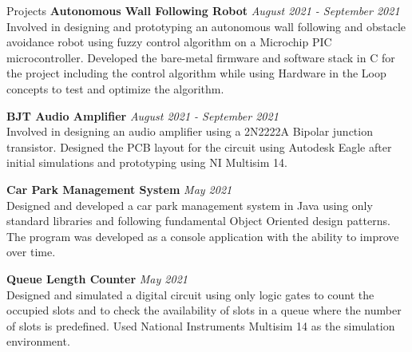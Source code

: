 \documentclass[
	11pt, %
]{./assets/resume} %
\begin{document}
\begin{rSection}{Projects}
{\bf Autonomous Wall Following Robot} \hfill {\em August 2021 - September 2021} \\
Involved in designing and prototyping an autonomous wall following and obstacle avoidance robot using fuzzy control algorithm on a Microchip PIC microcontroller. Developed the bare-metal firmware and software stack in C for the project including the control algorithm while using Hardware in the Loop concepts to test and optimize the algorithm.
    
{\bf BJT Audio Amplifier} \hfill {\em August 2021 - September 2021} \\
Involved in designing an audio amplifier using a 2N2222A Bipolar junction transistor. Designed the PCB layout for the circuit using Autodesk Eagle after initial simulations and prototyping using NI Multisim 14.
    
{\bf Car Park Management System} \hfill {\em May 2021} \\
Designed and developed a car park management system in Java using only standard libraries and following fundamental Object Oriented design patterns. The program was developed as a console application with the ability to improve over time.

{\bf Queue Length Counter} \hfill {\em May 2021} \\
Designed and simulated a digital circuit using only logic gates to count the occupied slots 
and to check the availability of slots in a queue where the number of slots is predefined. 
Used National Instruments Multisim 14 as the simulation environment. 

\end{rSection}





\end{document}
